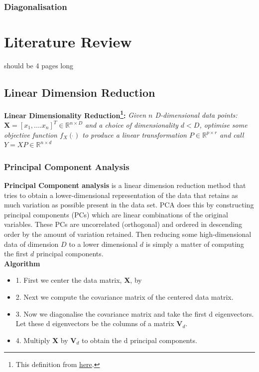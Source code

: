 \documentclass[12pt]{report}
\begin{document}
\subsection{Diagonalisation}




\chapter*{Literature Review}

should be 4 pages long

\section{Linear Dimension Reduction}

\textbf{Linear Dimensionality Reduction\footnote{This definition from \href{https://jmlr.csail.mit.edu/papers/volume16/cunningham15a/cunningham15a.pdf}{here}.}:} \textit{Given $n$ D-dimensional data points: $\textbf{X}= [x_1,....x_n]^T \in \mathbb{R}^{n \times D}$ and a choice of dimensionality $d < D$, optimise some objective function $f_X(\Dot{})$ to produce a linear transformation $P \in \mathbb{R}^{p \times r}$ and call $Y = XP \in \mathbb{R}^{n \times d}$}

\subsection{Principal Component Analysis}

\textbf{Principal Component analysis} is a linear dimension reduction method that tries to obtain a lower-dimensional representation of the data that retains as much variation as possible present in the data set. PCA does this by constructing principal components (PCs) which are linear combinations of the original variables. These PCs are uncorrelated (orthogonal) and ordered in descending order by the amount of variation retained. Then reducing some high-dimensional data of dimension $D$ to a lower dimensional $d$ is simply a matter of computing the first $d$ principal components.\\
\textbf{Algorithm}
\begin{itemize}
    \item 1. First we center the data matrix, \textbf{X}, by 
    \item 2. Next we compute the covariance matrix of the centered data matrix.
    \item 3. Now we diagonalise the covariance matrix and take the first d eigenvectors. Let these d eigenvectors be the columns of a matrix $\textbf{V}_d$.
    \item 4. Multiply \textbf{X} by $\textbf{V}_d$ to obtain the d principal components.
\end{itemize}
\end{document}
